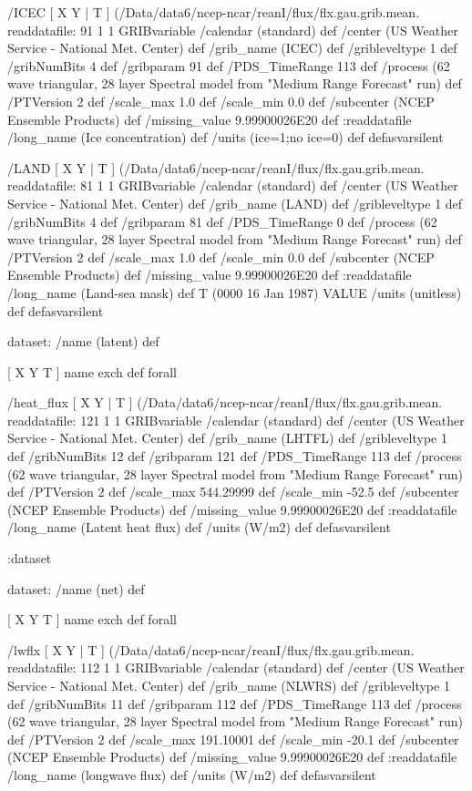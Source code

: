 \begin{ingrid}
  /ICEC { [ X Y | T ] (/Data/data6/ncep-ncar/reanI/flux/flx.gau.grib.mean.%
  readdatafile:
  91 1 1 GRIBvariable
  /calendar (standard) def
  /center (US Weather Service - National Met. Center) def
  /grib_name (ICEC) def
  /gribleveltype 1 def
  /gribNumBits 4 def
  /gribparam 91 def
  /PDS_TimeRange 113 def
  /process (62 wave triangular, 28 layer Spectral model from "Medium Range Forecast" run) def
  /PTVersion 2 def
  /scale_max 1.0 def
  /scale_min 0.0 def
  /subcenter (NCEP Ensemble Products) def
  /missing_value 9.99900026E20 def
  :readdatafile
  /long_name (Ice concentration) def
  /units (ice=1;no ice=0) def
  } defasvarsilent

  /LAND { [ X Y | T ] (/Data/data6/ncep-ncar/reanI/flux/flx.gau.grib.mean.%
  readdatafile:
  81 1 1 GRIBvariable
  /calendar (standard) def
  /center (US Weather Service - National Met. Center) def
  /grib_name (LAND) def
  /gribleveltype 1 def
  /gribNumBits 4 def
  /gribparam 81 def
  /PDS_TimeRange 0 def
  /process (62 wave triangular, 28 layer Spectral model from "Medium Range Forecast" run) def
  /PTVersion 2 def
  /scale_max 1.0 def
  /scale_min 0.0 def
  /subcenter (NCEP Ensemble Products) def
  /missing_value 9.99900026E20 def
  :readdatafile
  /long_name (Land-sea mask) def
  T (0000 16 Jan 1987) VALUE
  /units (unitless) def
  } defasvarsilent

  dataset: /name (latent) def

   [ X Y T ] { name exch def } forall

   /heat_flux { [ X Y | T ] (/Data/data6/ncep-ncar/reanI/flux/flx.gau.grib.mean.%
   readdatafile:
   121 1 1 GRIBvariable
   /calendar (standard) def
   /center (US Weather Service - National Met. Center) def
   /grib_name (LHTFL) def
   /gribleveltype 1 def
   /gribNumBits 12 def
   /gribparam 121 def
   /PDS_TimeRange 113 def
   /process (62 wave triangular, 28 layer Spectral model from "Medium Range Forecast" run) def
   /PTVersion 2 def
   /scale_max 544.29999 def
   /scale_min -52.5 def
   /subcenter (NCEP Ensemble Products) def
   /missing_value 9.99900026E20 def
   :readdatafile
   /long_name (Latent heat flux) def
   /units (W/m2) def
   } defasvarsilent

  :dataset

  dataset: /name (net) def

   [ X Y T ] { name exch def } forall

   /lwflx { [ X Y | T ] (/Data/data6/ncep-ncar/reanI/flux/flx.gau.grib.mean.%
   readdatafile:
   112 1 1 GRIBvariable
   /calendar (standard) def
   /center (US Weather Service - National Met. Center) def
   /grib_name (NLWRS) def
   /gribleveltype 1 def
   /gribNumBits 11 def
   /gribparam 112 def
   /PDS_TimeRange 113 def
   /process (62 wave triangular, 28 layer Spectral model from "Medium Range Forecast" run) def
   /PTVersion 2 def
   /scale_max 191.10001 def
   /scale_min -20.1 def
   /subcenter (NCEP Ensemble Products) def
   /missing_value 9.99900026E20 def
   :readdatafile
   /long_name (longwave flux) def
   /units (W/m2) def
   } defasvarsilent


\end{ingrid}
